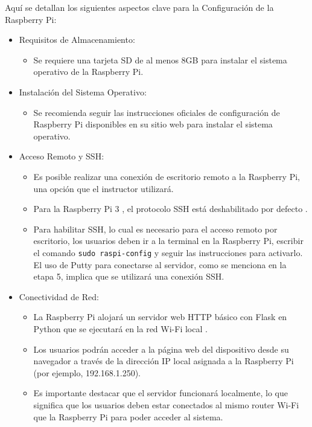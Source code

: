 \documentclass{report}
\begin{document}
Aquí se detallan los siguientes aspectos clave para la  Configuración de la Raspberry Pi:
\begin{itemize}
    \item Requisitos de Almacenamiento:
    \begin{itemize}
        \item Se requiere una  tarjeta SD de al menos 8GB  para instalar el sistema operativo de la Raspberry Pi.
    \end{itemize}

    \item Instalación del Sistema Operativo:
    \begin{itemize}
        \item Se recomienda seguir las  instrucciones oficiales de configuración de Raspberry Pi  disponibles en su sitio web para instalar el sistema 
        operativo.
    \end{itemize}

    \item Acceso Remoto y SSH:
    \begin{itemize}
        \item Es posible realizar una  conexión de escritorio remoto  a la Raspberry Pi, una opción que el instructor utilizará.
        \item Para la  Raspberry Pi 3 , el protocolo  SSH está deshabilitado por defecto .
        \item Para habilitar SSH, lo cual es necesario para el acceso remoto por escritorio, los usuarios deben ir a la terminal en la Raspberry Pi, 
        escribir el comando \verb|sudo raspi-config| y seguir las instrucciones para activarlo. El uso de  Putty  para conectarse al servidor, como se 
        menciona en la etapa 5, implica que se utilizará una conexión SSH.
    \end{itemize}
    
    \item Conectividad de Red:
    \begin{itemize}
        \item La Raspberry Pi alojará un  servidor web HTTP básico con Flask en Python  que se ejecutará en la  red Wi-Fi local .
        \item Los usuarios podrán acceder a la página web del dispositivo desde su navegador a través de la  dirección IP local  asignada a la 
        Raspberry Pi (por ejemplo, 192.168.1.250).
        \item Es importante destacar que el servidor funcionará localmente, lo que significa que los usuarios deben estar  conectados al mismo router 
        Wi-Fi  que la Raspberry Pi para poder acceder al sistema.
    \end{itemize}


\end{itemize}
\end{document}
